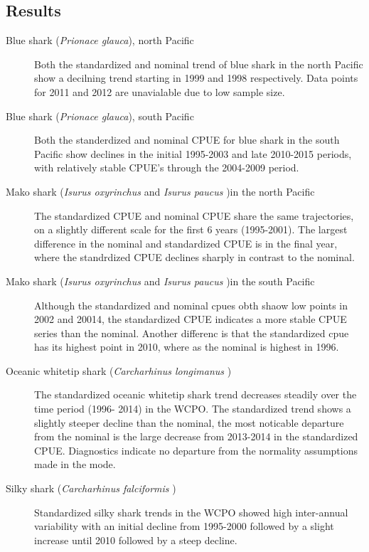 \subsection{Results}
\clearpage

 
\begin{description}
\item[Blue shark (\emph{Prionace glauca}), north Pacific] Both the standardized and nominal trend of blue shark in the north Pacific show a decilning trend starting in 1999 and 1998 respectively.   Data points for 2011 and 2012 are unavialable due to low sample size.  
 
 \item[Blue shark (\emph{Prionace glauca}), south Pacific ]  Both the standerdized and nominal CPUE for blue shark in the south Pacific show declines in the initial 1995-2003 and late 2010-2015 periods, with relatively stable CPUE's through the 
 2004-2009 period.  
 
 \item[Mako shark (\emph{Isurus oxyrinchus} and \emph{Isurus paucus} )in the north Pacific] 
The standardized CPUE and nominal CPUE share the same trajectories, on a slightly different scale for the first 6 years (1995-2001).  The largest difference in the nominal and standardized CPUE is in the final year, where the standrdized CPUE declines sharply in contrast to the nominal.
 
\item[Mako shark (\emph{Isurus oxyrinchus} and \emph{Isurus paucus} )in the south Pacific] Although  the standardized and nominal cpues obth shaow low points in 2002 and 20014, the standardized CPUE indicates a more stable CPUE series than the nominal.   Another differenc is that the standardized cpue has its highest point in 2010, where as the nominal is highest in 1996.  
 
\item[Oceanic whitetip shark (\emph{Carcharhinus longimanus} ) ] The standardized oceanic whitetip shark trend decreases steadily over the time period (1996- 2014) in the WCPO.  The standardized trend shows a slightly steeper decline than the nominal, the most noticable departure from the nominal is the large decrease from 2013-2014 in the standardized CPUE.   Diagnostics indicate no departure from the normality assumptions made in the mode.
 
 
 
 \item[Silky  shark (\emph{Carcharhinus falciformis} ) ] Standardized silky shark trends  in the WCPO showed high inter-annual variability with an initial decline from 1995-2000 followed by a slight increase until 2010 followed by a steep decline.  
 

\end{description}
